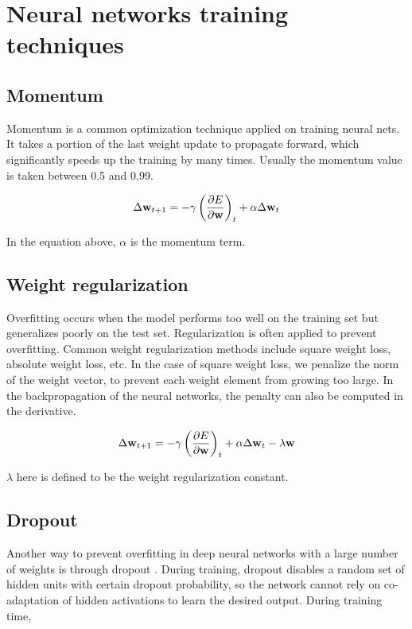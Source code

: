 \appendix
\chapter{Neural networks training techniques}
\label{train_tech}
\section{Momentum}
Momentum is a common optimization technique applied on training neural nets. It takes a portion of the last weight update to propagate forward, which significantly speeds up the training by many times. Usually the momentum value is taken between 0.5 and 0.99.

\begin{equation}
\Delta \mathbf{w}_{t+1} =  - \gamma \left(\dfrac{\partial E}{\partial \mathbf{w}}\right)_t  + \alpha \Delta \mathbf{w}_t
\end{equation}

In the equation above, $\alpha$ is the momentum term.

\section{Weight regularization}
Overfitting occurs when the model performs too well on the training set but generalizes poorly on the test set. Regularization is often applied to prevent overfitting. Common weight regularization methods include square weight loss, absolute weight loss, etc. In the case of square weight loss, we penalize the norm of the weight vector, to prevent each weight element from growing too large. In the backpropagation of the neural networks, the penalty can also be computed in the derivative.

\begin{equation}
\Delta \mathbf{w}_{t+1} = - \gamma \left(\dfrac{\partial E}{\partial \mathbf{w}}\right)_t  + \alpha \Delta \mathbf{w}_t - \lambda \mathbf{w}
\end{equation}

$\lambda$ here is defined to be the weight regularization constant.

\section{Dropout}
Another way to prevent overfitting in deep neural networks with a large number of weights is through dropout \cite{srivastava14}. During training, dropout disables a random set of hidden units with certain dropout probability, so the network cannot rely on co-adaptation of hidden activations to learn the desired output. During training time,

